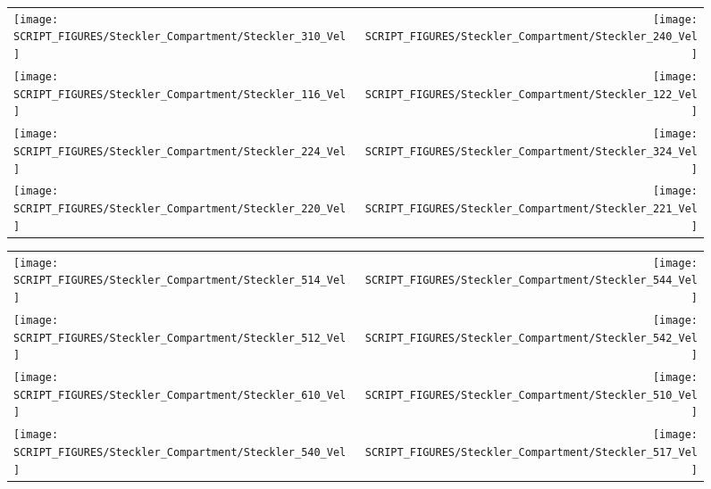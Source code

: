 \begin{figure}[p]
\begin{tabular*}{\textwidth}{l@{\extracolsep{\fill}}r}
\texttt{[image: SCRIPT\_FIGURES/Steckler\_Compartment/Steckler\_310\_Vel]} &
\texttt{[image: SCRIPT\_FIGURES/Steckler\_Compartment/Steckler\_240\_Vel]} \\
\texttt{[image: SCRIPT\_FIGURES/Steckler\_Compartment/Steckler\_116\_Vel]} &
\texttt{[image: SCRIPT\_FIGURES/Steckler\_Compartment/Steckler\_122\_Vel]} \\
\texttt{[image: SCRIPT\_FIGURES/Steckler\_Compartment/Steckler\_224\_Vel]} &
\texttt{[image: SCRIPT\_FIGURES/Steckler\_Compartment/Steckler\_324\_Vel]} \\
\texttt{[image: SCRIPT\_FIGURES/Steckler\_Compartment/Steckler\_220\_Vel]} &
\texttt{[image: SCRIPT\_FIGURES/Steckler\_Compartment/Steckler\_221\_Vel]}
\end{tabular*}
\label{Steckler_Vel_4}
\end{figure}

\begin{figure}[p]
\begin{tabular*}{\textwidth}{l@{\extracolsep{\fill}}r}
\texttt{[image: SCRIPT\_FIGURES/Steckler\_Compartment/Steckler\_514\_Vel]} &
\texttt{[image: SCRIPT\_FIGURES/Steckler\_Compartment/Steckler\_544\_Vel]} \\
\texttt{[image: SCRIPT\_FIGURES/Steckler\_Compartment/Steckler\_512\_Vel]} &
\texttt{[image: SCRIPT\_FIGURES/Steckler\_Compartment/Steckler\_542\_Vel]} \\
\texttt{[image: SCRIPT\_FIGURES/Steckler\_Compartment/Steckler\_610\_Vel]} &
\texttt{[image: SCRIPT\_FIGURES/Steckler\_Compartment/Steckler\_510\_Vel]} \\
\texttt{[image: SCRIPT\_FIGURES/Steckler\_Compartment/Steckler\_540\_Vel]} &
\texttt{[image: SCRIPT\_FIGURES/Steckler\_Compartment/Steckler\_517\_Vel]}
\end{tabular*}
\label{Steckler_Vel_5}
\end{figure}

